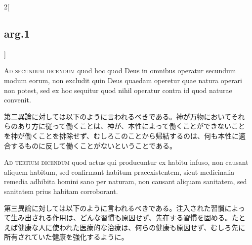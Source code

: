 \documentclass[paper=a4paper,fontsize=10pt,jafontsize=9pt,titlepage]{jlreq}
\begin{document}
\begin{paracol}{2}[\subsection{arg.1}]
\switchcolumn*[\subsection{ad.2}]

{\scshape Ad secundum dicendum} quod hoc quod Deus in omnibus operatur
secundum modum eorum, non excludit quin Deus quaedam operetur quae
natura operari non potest, sed ex hoc sequitur quod nihil operatur
contra id quod naturae convenit.

\switchcolumn

第二異論に対しては以下のように言われるべきである。神が万物においてそれ
らのあり方に従って働くことは、神が、本性によって働くことができないこと
を神が働くことを排除せず、むしろこのことから帰結するのは、何も本性に適
合するものに反して働くことがないということである。

\switchcolumn*[\subsection{ad.3}]

{\scshape Ad tertium dicendum} quod actus qui producuntur ex habitu
infuso, non causant aliquem habitum, sed confirmant habitum
praeexistentem, sicut medicinalia remedia adhibita homini sano per
naturam, non causant aliquam sanitatem, sed sanitatem prius habitam
corroborant.

\switchcolumn

第三異論に対しては以下のように言われるべきである。注入された習慣によっ
て生み出される作用は、どんな習慣も原因せず、先在する習慣を固める。たと
えば健康な人に使われた医療的な治療は、何らの健康も原因せず、むしろ先に
所有されていた健康を強化するように。

\end{paracol}
\end{document}
